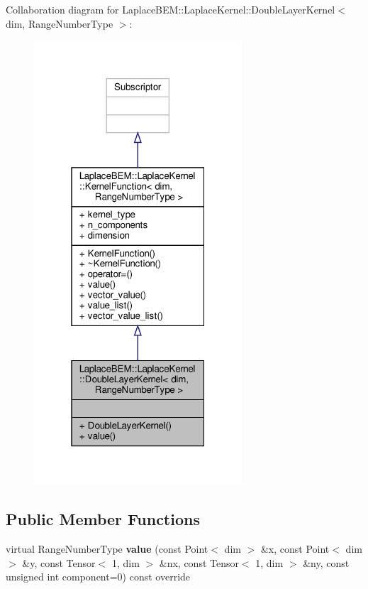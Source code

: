 Collaboration diagram for Laplace\+B\+EM\+:\+:Laplace\+Kernel\+:\+:Double\+Layer\+Kernel$<$ dim, Range\+Number\+Type $>$\+:\nopagebreak
\begin{figure}[H]
\begin{center}
\leavevmode
\includegraphics[width=220pt]{classLaplaceBEM_1_1LaplaceKernel_1_1DoubleLayerKernel__coll__graph}
\end{center}
\end{figure}
\subsection*{Public Member Functions}
\begin{DoxyCompactItemize}
\item 
\mbox{\label{classLaplaceBEM_1_1LaplaceKernel_1_1DoubleLayerKernel_a44836d10e150f631a40d16dc2092fdad}} 
virtual Range\+Number\+Type {\bfseries value} (const Point$<$ dim $>$ \&x, const Point$<$ dim $>$ \&y, const Tensor$<$ 1, dim $>$ \&nx, const Tensor$<$ 1, dim $>$ \&ny, const unsigned int component=0) const override
\end{DoxyCompactItemize}
